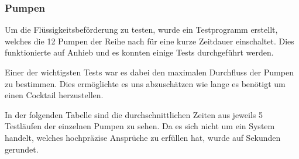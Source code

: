 \subsubsection{Pumpen}
\label{subsubsec:Inbetriebnahme_Pumpen}

Um die Flüssigkeitsbeförderung zu testen, wurde ein Testprogramm erstellt, welches die 12 Pumpen der Reihe nach für eine kurze Zeitdauer einschaltet. Dies funktionierte auf Anhieb und es konnten einige Tests durchgeführt werden. 

Einer der wichtigsten Tests war es dabei den maximalen Durchfluss der Pumpen zu bestimmen. Dies ermöglichte es uns abzuschätzen wie lange es benötigt um einen Cocktail herzustellen. 

In der folgenden Tabelle sind die durchschnittlichen Zeiten aus jeweils 5 Testläufen der einzelnen Pumpen zu sehen. Da es sich nicht um ein System handelt, welches hochpräzise Ansprüche zu erfüllen hat, wurde auf Sekunden gerundet.

